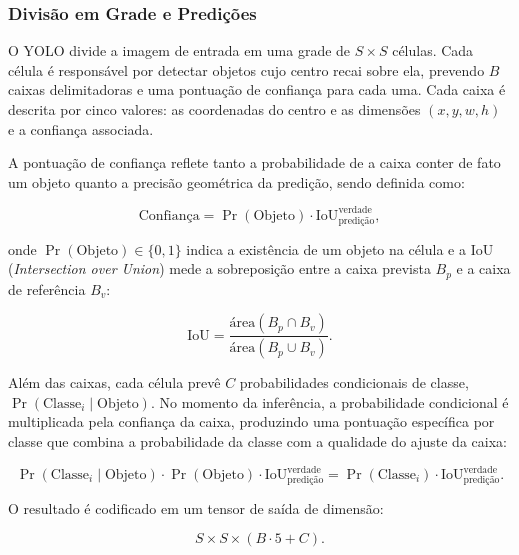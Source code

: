 \subsubsection{Divisão em Grade e Predições}

O YOLO divide a imagem de entrada em uma grade de $S \times S$ células. Cada
célula é responsável por detectar objetos cujo centro recai sobre ela, prevendo
$B$ caixas delimitadoras e uma pontuação de confiança para cada uma. Cada caixa é
descrita por cinco valores: as coordenadas do centro e as dimensões
$(x, y, w, h)$ e a confiança associada.

A pontuação de confiança reflete tanto a probabilidade de a caixa conter de fato
um objeto quanto a precisão geométrica da predição, sendo definida como:

\begin{equation}
  \label{eq:confianca}
  \text{Confiança} = \Pr(\text{Objeto}) \cdot \text{IoU}^{\text{verdade}}_{\text{predição}} ,
\end{equation}

onde $\Pr(\text{Objeto}) \in \{0, 1\}$ indica a existência de um objeto na célula
e a IoU (\textit{Intersection over Union}) mede a sobreposição entre a caixa
prevista $B_p$ e a caixa de referência $B_v$:

\begin{equation}
  \label{eq:iou}
  \text{IoU} = \frac{\text{área}(B_p \cap B_v)}{\text{área}(B_p \cup B_v)} .
\end{equation}

Além das caixas, cada célula prevê $C$ probabilidades condicionais de classe,
$\Pr(\text{Classe}_i \mid \text{Objeto})$. No momento da inferência, a
probabilidade condicional é multiplicada pela confiança da caixa, produzindo uma
pontuação específica por classe que combina a probabilidade da classe com a
qualidade do ajuste da caixa:

\begin{equation}
  \Pr(\text{Classe}_i \mid \text{Objeto}) \cdot \Pr(\text{Objeto}) \cdot
  \text{IoU}^{\text{verdade}}_{\text{predição}} =
  \Pr(\text{Classe}_i) \cdot \text{IoU}^{\text{verdade}}_{\text{predição}} .
\end{equation}

O resultado é codificado em um tensor de saída de dimensão:

\begin{equation}
  \label{eq:tensor}
  S \times S \times (B \cdot 5 + C) .
\end{equation}

